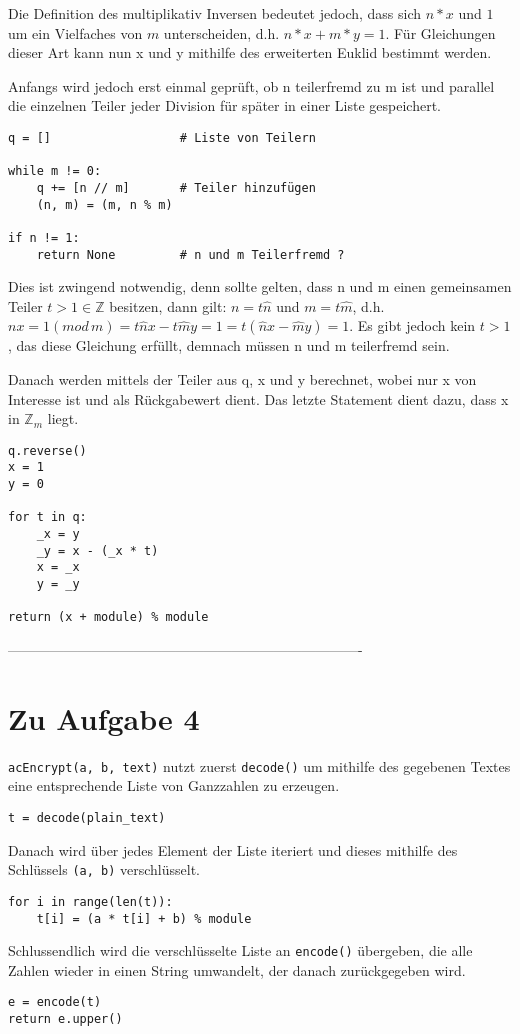 \documentclass[12pt]{article}
\begin{document}
Die Definition des multiplikativ Inversen bedeutet jedoch, dass sich $n * x$ und $1$ um ein Vielfaches von $m$ unterscheiden, d.h. $n*x + m*y = 1$. Für Gleichungen dieser Art kann nun x und y mithilfe des erweiterten Euklid bestimmt werden.

Anfangs wird jedoch erst einmal geprüft, ob n teilerfremd zu m ist und parallel die einzelnen Teiler jeder Division für später in einer Liste gespeichert.
\begin{lstlisting}
q = []					# Liste von Teilern

while m != 0:
	q += [n // m]		# Teiler hinzufügen
	(n, m) = (m, n % m)
	
if n != 1:
	return None			# n und m Teilerfremd ?
\end{lstlisting}
Dies ist zwingend notwendig, denn sollte gelten, dass n und m einen gemeinsamen Teiler $t > 1 \in \mathbb{Z}$ besitzen, dann gilt: $n = t\hat{n}$ und $m = t\hat{m}$, d.h. $nx = 1 (mod \, m) = t\hat{n}x - t\hat{m}y = 1 = t(\hat{n}x - \hat{m}y) = 1$. Es gibt jedoch kein $t > 1$, das diese Gleichung erfüllt, demnach müssen n und m teilerfremd sein.

Danach werden mittels der Teiler aus q, x und y berechnet, wobei nur x von Interesse ist und als Rückgabewert dient. Das letzte Statement dient dazu, dass x in $\mathbb{Z}_{m}$ liegt.
\begin{lstlisting}
q.reverse()
x = 1
y = 0

for t in q:
	_x = y
	_y = x - (_x * t)
	x = _x
	y = _y
	
return (x + module) % module
\end{lstlisting}

%
 ----------------------------------------------------------------------------
\section{Zu Aufgabe 4}
\texttt{acEncrypt(a, b, text)} nutzt zuerst \texttt{decode()} um mithilfe des gegebenen Textes eine entsprechende Liste von Ganzzahlen zu erzeugen. 
\begin{lstlisting}
t = decode(plain_text)
\end{lstlisting}
Danach wird über jedes Element der Liste iteriert und dieses mithilfe des Schlüssels \texttt{(a, b)} verschlüsselt. 
\begin{lstlisting}
for i in range(len(t)):
	t[i] = (a * t[i] + b) % module
\end{lstlisting}
Schlussendlich wird die verschlüsselte Liste an \texttt{encode()} übergeben, die alle Zahlen wieder in einen String umwandelt, der danach zurückgegeben wird.
\begin{lstlisting}
e = encode(t)
return e.upper()
\end{lstlisting}
\end{document}
